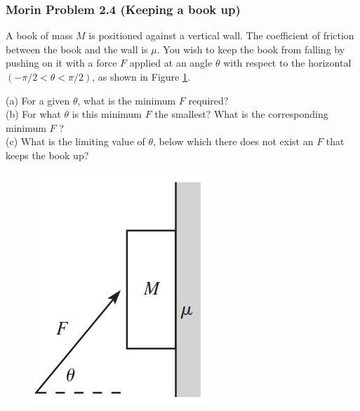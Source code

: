 \documentclass{article}
\begin{document}
\subsubsection{Morin Problem 2.4 (Keeping a book up)}
A book of mass $M$ is positioned against a vertical wall. The coefficient of friction between the book and the wall is $\mu$. You wish to keep the book from falling by pushing on it with a force $F$ applied at an angle $\theta$ with respect to the horizontal $(-\pi / 2<\theta<\pi / 2)$, as shown in Figure \ref{fig:morinkeepingbookup}. \\[10pt]
{
(a) For a given $\theta$, what is the minimum $F$ required? \\[5pt]
(b) For what $\theta$ is this minimum $F$ the smallest? What is the corresponding minimum $F$ ?\\[5pt]
(c) What is the limiting value of $\theta$, below which there does not exist an $F$ that keeps the book up?\\[5pt]
\begin{figure} 
\includegraphics[width=\linewidth]{images/morinkeepingbookup.png}
\label{fig:morinkeepingbookup}
\end{figure}
}
\clearpage
\end{document}
